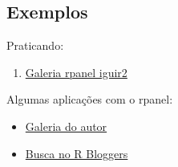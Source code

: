 

\subsection{Exemplos}

\begin{frame}
  Praticando:
  \begin{enumerate}
  \item \href{run:../rpanel/rpanel.html}{Galeria rpanel iguir2}
  \end{enumerate}

  \vspace{0.5cm} Algumas aplicações com o rpanel:
  \begin{itemize}
  \item \href{http://www.stats.gla.ac.uk/~adrian/rpanel/}{Galeria do
      autor}
  \item \href{http://www.r-bloggers.com/?s=rpanel}{Busca no R Bloggers}
  \end{itemize}

\end{frame}

